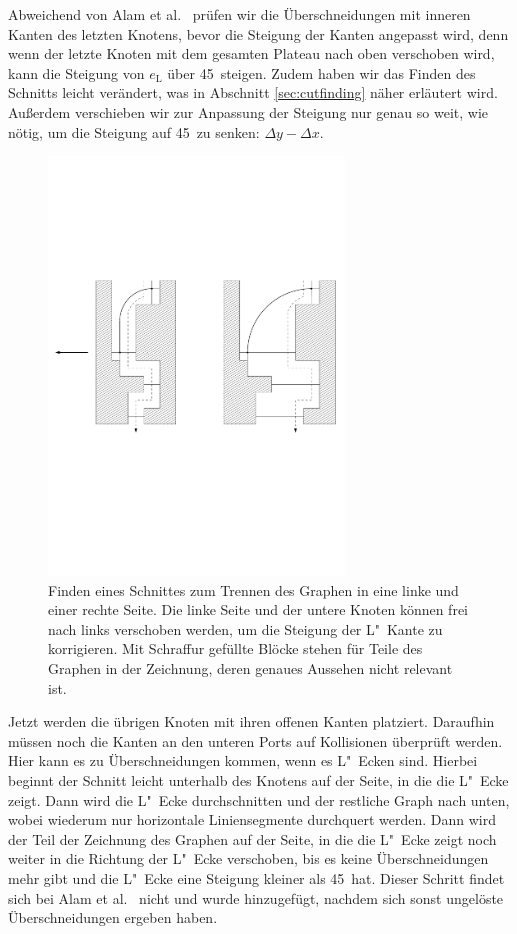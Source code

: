 \documentclass[a4paper]{scrreprt}
\theoremstyle{definition}
\begin{document}
Abweichend von Alam et al.~\cite{smooth-13} prüfen wir die Überschneidungen mit inneren Kanten des letzten Knotens, bevor die Steigung der Kanten angepasst wird, denn wenn der letzte Knoten mit dem gesamten Plateau nach oben verschoben wird, kann die Steigung von $e_\text{L}$ über 45\textdegree\ steigen. Zudem haben wir das Finden des Schnitts leicht verändert, was in Abschnitt \ref{sec:cutfinding} näher erläutert wird. Außerdem verschieben wir zur Anpassung der Steigung nur genau so weit, wie nötig, um die Steigung auf 45\textdegree\ zu senken: $\Delta y - \Delta x$.

\begin{figure}[h]
  \centering
  \includegraphics[width=0.7\textwidth]{cut_L_slope_correction}
  \caption{Finden eines Schnittes zum Trennen des Graphen in eine linke und einer rechte Seite. Die linke Seite und der untere Knoten können frei nach links verschoben werden, um die Steigung der L"~Kante zu korrigieren. Mit Schraffur gefüllte Blöcke stehen für Teile des Graphen in der Zeichnung, deren genaues Aussehen nicht relevant ist.}
  \label{fig:cutLslopecorrection}
\end{figure}

Jetzt werden die übrigen Knoten mit ihren offenen Kanten platziert. Daraufhin müssen noch die Kanten an den unteren Ports auf Kollisionen überprüft werden. Hier kann es zu Überschneidungen kommen, wenn es L"~Ecken sind. Hierbei beginnt der Schnitt leicht unterhalb des Knotens auf der Seite, in die die L"~Ecke zeigt. Dann wird die L"~Ecke durchschnitten und der restliche Graph nach unten, wobei wiederum nur horizontale Liniensegmente durchquert werden. Dann wird der Teil der Zeichnung des Graphen auf der Seite, in die die L"~Ecke zeigt noch weiter in die Richtung der L"~Ecke verschoben, bis es keine Überschneidungen mehr gibt und die L"~Ecke eine Steigung kleiner als 45\textdegree\ hat. Dieser Schritt findet sich bei Alam et al.~\cite{smooth-13} nicht und wurde hinzugefügt, nachdem sich sonst ungelöste Überschneidungen ergeben haben.
\end{document}
